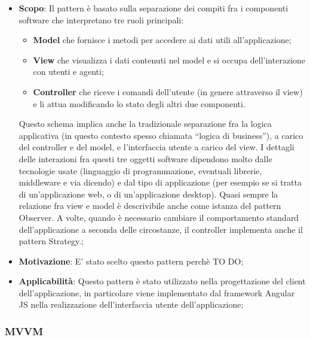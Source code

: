 		\begin{itemize}
			\item \textbf{Scopo}: Il pattern è basato sulla separazione dei compiti fra i componenti software che interpretano tre ruoli principali:
			
		\begin{itemize}
			\item \textbf{Model} che fornisce i metodi per accedere ai dati utili all'applicazione;
			\item \textbf{View} che visualizza i dati contenuti nel model e si occupa dell'interazione con utenti e agenti;
			\item \textbf{Controller} che riceve i comandi dell'utente (in genere attraverso il view) e li attua modificando lo stato degli altri due componenti.
		\end{itemize}
		
		\noindent
		Questo schema implica anche la tradizionale separazione fra la logica applicativa (in questo contesto spesso chiamata ``logica di business''), a carico del controller e del model, e l'interfaccia utente a carico del view. I dettagli delle interazioni fra questi tre oggetti software dipendono molto dalle tecnologie usate (linguaggio di programmazione, eventuali librerie, middleware e via dicendo) e dal tipo di applicazione (per esempio se si tratta di un'applicazione web, o di un'applicazione desktop). Quasi sempre la relazione fra view e model è descrivibile anche come istanza del pattern Observer. A volte, quando è necessario cambiare il comportamento standard dell'applicazione a seconda delle circostanze, il controller implementa anche il pattern Strategy.;
			
			\item \textbf{Motivazione}: E' stato scelto questo pattern perchè TO DO;
			
			\item \textbf{Applicabilità}: Questo pattern è stato utilizzato nella progettazione del client dell'applicazione, in particolare viene implementato dal framework Angular JS nella realizzazione dell'interfaccia utente dell'applicazione;
		\end{itemize}	
				
		
		\newpage
		\subsubsection{MVVM} %
		
